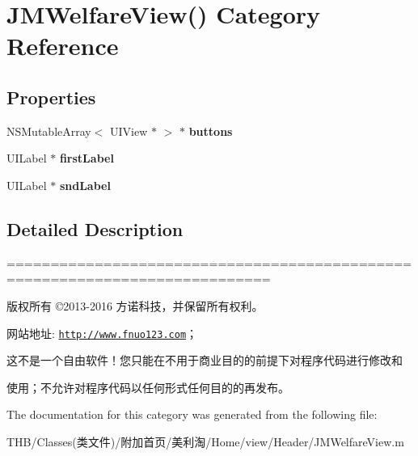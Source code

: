 \hypertarget{category_j_m_welfare_view_07_08}{}\section{J\+M\+Welfare\+View() Category Reference}
\label{category_j_m_welfare_view_07_08}
\subsection*{Properties}
\begin{DoxyCompactItemize}
\item 
\mbox{\label{category_j_m_welfare_view_07_08_a0f04b2fc63e0d0673969eb6128f6df3e}} 
N\+S\+Mutable\+Array$<$ U\+I\+View $\ast$ $>$ $\ast$ {\bfseries buttons}
\item 
\mbox{\label{category_j_m_welfare_view_07_08_af480aa102aad41f96ecb3175685cdcef}} 
U\+I\+Label $\ast$ {\bfseries first\+Label}
\item 
\mbox{\label{category_j_m_welfare_view_07_08_a34234bf00bd12b23d4b513cb203f79a8}} 
U\+I\+Label $\ast$ {\bfseries snd\+Label}
\end{DoxyCompactItemize}


\subsection{Detailed Description}
============================================================================

版权所有 ©2013-\/2016 方诺科技，并保留所有权利。

网站地址\+: \href{http://www.fnuo123.com}{\tt http\+://www.\+fnuo123.\+com}； 



这不是一个自由软件！您只能在不用于商业目的的前提下对程序代码进行修改和

使用；不允许对程序代码以任何形式任何目的的再发布。 

 

The documentation for this category was generated from the following file\+:\begin{DoxyCompactItemize}
\item 
T\+H\+B/\+Classes(类文件)/附加首页/美利淘/\+Home/view/\+Header/J\+M\+Welfare\+View.\+m\end{DoxyCompactItemize}
